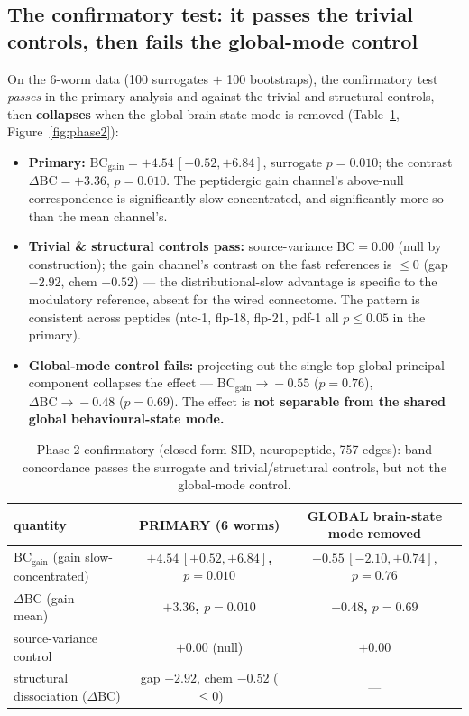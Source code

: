 \documentclass[11pt]{article}
\newcommand{\sigmark}[1]{\textcolor{sig}{\textbf{#1}}}
\newcommand{\warnmark}[1]{\textcolor{warn}{\textbf{#1}}}
\begin{document}
\subsection{The confirmatory test: it passes the trivial controls, then fails the global-mode control}
On the 6-worm data (100 surrogates $+$ 100 bootstraps), the confirmatory test \emph{passes} in the
primary analysis and against the trivial and structural controls, then \warnmark{collapses} when the
global brain-state mode is removed (Table~\ref{tab:phase2}, Figure~\ref{fig:phase2}):
\begin{itemize}[topsep=2pt,itemsep=1pt]
  \item \textbf{Primary:} $\mathrm{BC}_{\text{gain}}=+4.54\,[+0.52,+6.84]$, surrogate $p=0.010$; the
        contrast $\Delta\mathrm{BC}=+3.36$, $p=0.010$. The peptidergic gain channel's above-null
        correspondence is significantly slow-concentrated, and significantly more so than the mean
        channel's.
  \item \textbf{Trivial \& structural controls pass:} source-variance $\mathrm{BC}=0.00$ (null by
        construction); the gain channel's contrast on the fast references is $\le0$ (gap $-2.92$,
        chem $-0.52$) --- the distributional-slow advantage is specific to the modulatory reference,
        absent for the wired connectome. The pattern is consistent across peptides (ntc-1, flp-18,
        flp-21, pdf-1 all $p\le0.05$ in the primary).
  \item \textbf{Global-mode control fails:} projecting out the single top global principal component
        collapses the effect --- $\mathrm{BC}_{\text{gain}}\!\to\!-0.55$ ($p=0.76$),
        $\Delta\mathrm{BC}\!\to\!-0.48$ ($p=0.69$). The effect is \warnmark{not separable from the
        shared global behavioural-state mode.}
\end{itemize}

\begin{table}[t]
\centering
\small
\caption{Phase-2 confirmatory (closed-form SID, neuropeptide, 757 edges): band concordance passes the
surrogate and trivial/structural controls, but not the global-mode control.}
\label{tab:phase2}
\begin{tabular}{lcc}
\toprule
quantity & PRIMARY (6 worms) & GLOBAL brain-state mode removed\\
\midrule
$\mathrm{BC}_{\text{gain}}$ (gain slow-concentrated) & \sigmark{$+4.54\,[+0.52,+6.84]$, $p{=}0.010$} & $-0.55\,[-2.10,+0.74]$, $p{=}0.76$\\
$\Delta\mathrm{BC}$ (gain $-$ mean) & \sigmark{$+3.36$, $p{=}0.010$} & \warnmark{$-0.48$, $p{=}0.69$}\\
source-variance control & $+0.00$ (null) & $+0.00$\\
structural dissociation ($\Delta\mathrm{BC}$) & gap $-2.92$, chem $-0.52$ ($\le0$) & ---\\
\bottomrule
\end{tabular}
\end{table}
\end{document}
